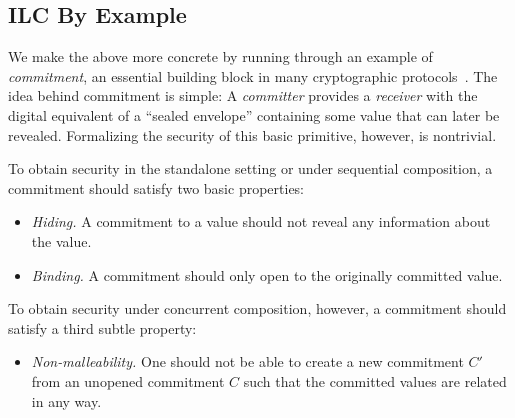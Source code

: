 \subsection{ILC By Example}
\label{subsec:ilc-flavored}

We make the above more concrete by running through an example of
\emph{commitment}, an essential building block in many cryptographic
protocols~\cite{brassard1988minimum}. The idea behind commitment is simple: A
\emph{committer} provides a \emph{receiver} with the digital equivalent of a
``sealed envelope'' containing some value that can later be
revealed. Formalizing the security of this basic primitive, however, is
nontrivial.

To obtain security in the standalone setting or under sequential composition, a
commitment should satisfy two basic properties:
\begin{itemize}[leftmargin=*]
\item \emph{Hiding.} A commitment to a value should not reveal any information
  about the value.
\item \emph{Binding.} A commitment should only open to the originally committed value.
\end{itemize}

\noindent To obtain security under concurrent composition, however, a commitment
should satisfy a third subtle property:
\begin{itemize}[leftmargin=*]
\item \emph{Non-malleability.} One should not be able to create a new commitment
  $C'$ from an unopened commitment $C$ such that the committed values are
  related in any way.
\end{itemize}

